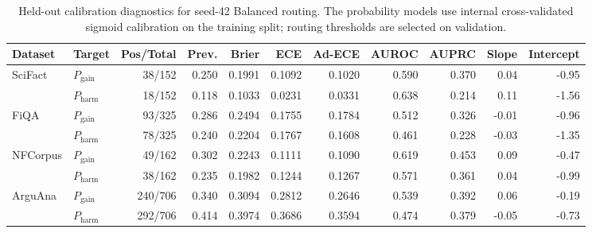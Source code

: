 \begin{table}[t]
\centering
\caption{Held-out calibration diagnostics for seed-42 Balanced routing. The probability models use internal cross-validated sigmoid calibration on the training split; routing thresholds are selected on validation.}
\label{tab:calibration}
\scriptsize
\begin{tabular}{llrrrrrrrrr}
\toprule
Dataset & Target & Pos/Total & Prev. & Brier & ECE & Ad-ECE & AUROC & AUPRC & Slope & Intercept \\
\midrule
SciFact & $P_{\mathrm{gain}}$ & 38/152 & 0.250 & 0.1991 & 0.1092 & 0.1020 & 0.590 & 0.370 & 0.04 & -0.95 \\
 & $P_{\mathrm{harm}}$ & 18/152 & 0.118 & 0.1033 & 0.0231 & 0.0331 & 0.638 & 0.214 & 0.11 & -1.56 \\
FiQA & $P_{\mathrm{gain}}$ & 93/325 & 0.286 & 0.2494 & 0.1755 & 0.1784 & 0.512 & 0.326 & -0.01 & -0.96 \\
 & $P_{\mathrm{harm}}$ & 78/325 & 0.240 & 0.2204 & 0.1767 & 0.1608 & 0.461 & 0.228 & -0.03 & -1.35 \\
NFCorpus & $P_{\mathrm{gain}}$ & 49/162 & 0.302 & 0.2243 & 0.1111 & 0.1090 & 0.619 & 0.453 & 0.09 & -0.47 \\
 & $P_{\mathrm{harm}}$ & 38/162 & 0.235 & 0.1982 & 0.1244 & 0.1267 & 0.571 & 0.361 & 0.04 & -0.99 \\
ArguAna & $P_{\mathrm{gain}}$ & 240/706 & 0.340 & 0.3094 & 0.2812 & 0.2646 & 0.539 & 0.392 & 0.06 & -0.19 \\
 & $P_{\mathrm{harm}}$ & 292/706 & 0.414 & 0.3974 & 0.3686 & 0.3594 & 0.474 & 0.379 & -0.05 & -0.73 \\
\bottomrule
\end{tabular}
\end{table}